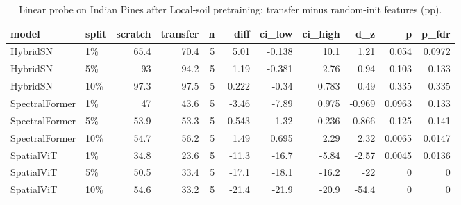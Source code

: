 \begin{table}
\caption{Linear probe on Indian Pines after Local-soil pretraining: transfer minus random-init features (pp).}
\label{tab:stats_linear_probe}
\begin{tabular}{llrrrrrrrrr}
\toprule
model & split & scratch & transfer & n & diff & ci\_low & ci\_high & d\_z & p & p\_fdr \\
\midrule
HybridSN & 1\% & 65.4 & 70.4 & 5 & 5.01 & -0.138 & 10.1 & 1.21 & 0.054 & 0.0972 \\
HybridSN & 5\% & 93 & 94.2 & 5 & 1.19 & -0.381 & 2.76 & 0.94 & 0.103 & 0.133 \\
HybridSN & 10\% & 97.3 & 97.5 & 5 & 0.222 & -0.34 & 0.783 & 0.49 & 0.335 & 0.335 \\
SpectralFormer & 1\% & 47 & 43.6 & 5 & -3.46 & -7.89 & 0.975 & -0.969 & 0.0963 & 0.133 \\
SpectralFormer & 5\% & 53.9 & 53.3 & 5 & -0.543 & -1.32 & 0.236 & -0.866 & 0.125 & 0.141 \\
SpectralFormer & 10\% & 54.7 & 56.2 & 5 & 1.49 & 0.695 & 2.29 & 2.32 & 0.0065 & 0.0147 \\
SpatialViT & 1\% & 34.8 & 23.6 & 5 & -11.3 & -16.7 & -5.84 & -2.57 & 0.0045 & 0.0136 \\
SpatialViT & 5\% & 50.5 & 33.4 & 5 & -17.1 & -18.1 & -16.2 & -22 & 0 & 0 \\
SpatialViT & 10\% & 54.6 & 33.2 & 5 & -21.4 & -21.9 & -20.9 & -54.4 & 0 & 0 \\
\bottomrule
\end{tabular}
\end{table}

